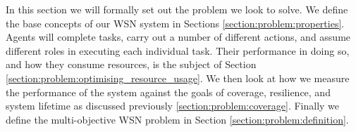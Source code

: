 
In this section we will formally set out the problem we look to solve. We define the base concepts of our WSN system in Sections \ref{section:problem:properties}. Agents will complete tasks, carry out a number of different actions, and assume different roles in executing each individual task. Their performance in doing so, and how they consume resources, is the subject of Section \ref{section:problem:optimising_resource_usage}. We then look at how we measure the performance of the system against the goals of coverage, resilience, and system lifetime as discussed previously \ref{section:problem:coverage}. Finally we define the multi-objective WSN problem in Section \ref{section:problem:definition}. 
